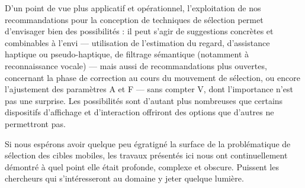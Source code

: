 	D'un point de vue plus applicatif et opérationnel, l'exploitation de nos recommandations pour la conception de techniques de sélection permet d'envisager bien des possibilités : il peut s'agir de suggestions concrètes et combinables à l'envi --- utilisation de l'estimation du regard, d'assistance haptique ou pseudo-haptique, de filtrage sémantique (notamment à reconnaissance vocale) --- mais aussi de recommandations plus ouvertes, concernant la phase de correction au cours du mouvement de sélection, ou encore l'ajustement des paramètres A et F --- sans compter V, dont l'importance n'est pas une surprise. Les possibilités sont d'autant plus nombreuses que certains dispositifs d'affichage et d'interaction offriront des options que d'autres ne permettront pas.
	
	Si nous espérons avoir quelque peu égratigné la surface de la problématique de sélection des cibles mobiles, les travaux présentés ici nous ont continuellement démontré à quel point elle était profonde, complexe et obscure. Puissent les chercheurs qui s'intéresseront au domaine y jeter quelque lumière.